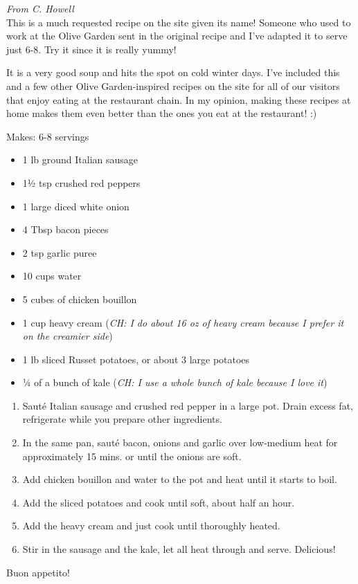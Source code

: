 
\textit{From C. Howell}\\

This is a much requested recipe on the site given its name! Someone who used to
work at the Olive Garden sent in the original recipe and I've adapted it to
serve just 6-8. Try it since it is really yummy!

It is a very good soup and hits the spot on cold winter days. I've included
this and a few other Olive Garden-inspired recipes on the site for all of our
visitors that enjoy eating at the restaurant chain. In my opinion, making these
recipes at home makes them even better than the ones you eat at the restaurant!
:)

Makes: 6-8 servings

\ingredients
\begin{itemize}
	\item 1 lb ground Italian sausage
	\item 1½ tsp crushed red peppers
	\item 1 large diced white onion
	\item 4 Tbsp bacon pieces
	\item 2 tsp garlic puree
	\item 10 cups water
	\item 5 cubes of chicken bouillon
	\item 1 cup heavy cream (\textit{CH: I do about 16 oz of heavy cream because I prefer it on the creamier side})
	\item 1 lb sliced Russet potatoes, or about 3 large potatoes
	\item ¼ of a bunch of kale (\textit{CH: I use a whole bunch of kale because I love it})
\end{itemize}

\instructions
\begin{enumerate}
	\item Sauté Italian sausage and crushed red pepper in a large pot. Drain excess fat, refrigerate while you prepare other ingredients.
	\item In the same pan, sauté bacon, onions and garlic over low-medium heat for approximately 15 mins. or until the onions are soft.
	\item Add chicken bouillon and water to the pot and heat until it starts to boil.
	\item Add the sliced potatoes and cook until soft, about half an hour.
	\item Add the heavy cream and just cook until thoroughly heated.
	\item Stir in the sausage and the kale, let all heat through and serve. Delicious!
\end{enumerate}

Buon appetito!
